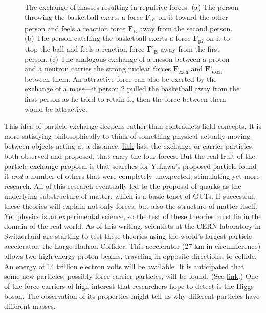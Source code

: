\documentclass[
]{book}
\begin{document}
\begin{figure}
{\caption{The exchange of masses resulting in repulsive forces. (a) The person
throwing the basketball exerts a force
\(\textbf{F}_{\text{p1}}{}\)\textsubscript{} on it toward
the other person and feels a reaction force \(\textbf{F}_{\text{B}}\) away
from the second person. (b) The person catching the basketball exerts a
force \(\textbf{F}_{\text{p2}}\) on it to stop the ball and feels a
reaction force \(\textbf{F'}_{\text{B}}{}\) away from the first person.
(c) The analogous exchange of a meson between a proton and a neutron
carries the strong nuclear forces \(\textbf{F}_{\text{exch}}\) and
\(\textbf{F'}_{\text{exch}}\) between them. An attractive force can also
be exerted by the exchange of a mass---if person 2 pulled the basketball
away from the first person as he tried to retain it, then the force
between them would be
attractive.}\label{import-auto-id2011579}
}
\end{figure}

This idea of particle exchange deepens rather than contradicts field
concepts. It is more satisfying philosophically to think of something
physical actually moving between objects acting at a distance.
\protect\hyperlink{import-auto-id1588108}{link} lists the
exchange or \protect\hypertarget{import-auto-id1561662}{}{carrier particles}, both observed and proposed, that carry the four
forces. But the real fruit of the particle-exchange proposal is that
searches for Yukawa's proposed particle found it \emph{and} a number of
others that were completely unexpected, stimulating yet more research.
All of this research eventually led to the proposal of quarks as the
underlying substructure of matter, which is a basic tenet of GUTs. If
successful, these theories will explain not only forces, but also the
structure of matter itself. Yet physics is an experimental science, so
the test of these theories must lie in the domain of the real world. As
of this writing, scientists at the CERN laboratory in Switzerland are
starting to test these theories using the world's largest particle
accelerator: the Large Hadron Collider. This accelerator (27 km in
circumference) allows two high-energy proton beams, traveling in
opposite directions, to collide. An energy of 14 trillion electron volts
will be available. It is anticipated that some new particles, possibly
force carrier particles, will be found. (See
\protect\hyperlink{import-auto-id2658974}{link}.) One of the
force carriers of high interest that researchers hope to detect is the
Higgs boson. The observation of its properties might tell us why
different particles have different masses.
\end{document}
